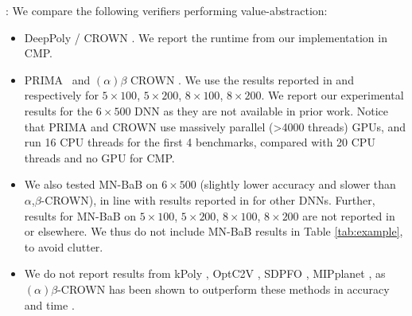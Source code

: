 : 
We compare the following verifiers performing value-abstraction:
\begin{itemize}
	\item DeepPoly \cite{deeppoly}/ CROWN \cite{crown}. We report the runtime from our  implementation in CMP. 
	\item PRIMA~\cite{prima} and $(\alpha)\beta$ CROWN \cite{crown}. We use the results reported in \cite{prima} and \cite{crown} respectively for 
	$5\times 100$, $5\times 200$, $8 \times 100$, $8 \times 200$.
	We report our experimental results for the $6\times500$ DNN as they are not available in prior work. Notice that PRIMA and CROWN use massively parallel (>4000 threads) GPUs, and run 16 CPU threads for the first 4 benchmarks, compared with 20 CPU threads and no GPU for CMP.
	\item We also tested MN-BaB \cite{ferrari2022complete} on $6\times500$
	(slightly lower accuracy and slower than $\alpha$,$\beta$-CROWN), 
	in line with results reported in \cite{ferrari2022complete} for other DNNs. Further, results for MN-BaB on $5\times 100$, $5\times 200$, $8 \times 100$, $8 \times 200$	are not reported in \cite{ferrari2022complete} or elsewhere. 
	We thus do not include MN-BaB results in Table \ref{tab:example}, to avoid clutter.
	\item We do not report results from kPoly \cite{kpoly}, OptC2V \cite{optC2V}, 
	SDPFO \cite{SDPFI}, MIPplanet \cite{MIPplanet}, as $(\alpha)\beta$-CROWN has been shown to outperform these methods in accuracy and time \cite{crown}.
	
\end{itemize}



